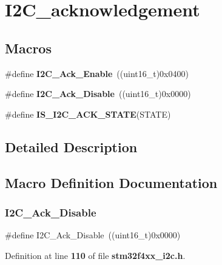 \section{I2\+C\+\_\+acknowledgement}
\label{group__I2C__acknowledgement}
\subsection*{Macros}
\begin{DoxyCompactItemize}
\item 
\#define \textbf{ I2\+C\+\_\+\+Ack\+\_\+\+Enable}~((uint16\+\_\+t)0x0400)
\item 
\#define \textbf{ I2\+C\+\_\+\+Ack\+\_\+\+Disable}~((uint16\+\_\+t)0x0000)
\item 
\#define \textbf{ I\+S\+\_\+\+I2\+C\+\_\+\+A\+C\+K\+\_\+\+S\+T\+A\+TE}(S\+T\+A\+TE)
\end{DoxyCompactItemize}


\subsection{Detailed Description}


\subsection{Macro Definition Documentation}
\mbox{\label{group__I2C__acknowledgement_gadb5f47c052ac6bae1aa58c724e339e36}} 
\subsubsection{I2\+C\+\_\+\+Ack\+\_\+\+Disable}
{\footnotesize\ttfamily \#define I2\+C\+\_\+\+Ack\+\_\+\+Disable~((uint16\+\_\+t)0x0000)}



Definition at line \textbf{ 110} of file \textbf{ stm32f4xx\+\_\+i2c.\+h}.

\mbox{\label{group__I2C__acknowledgement_ga616466f8ef5a47237cdbf7ac578ec507}} 
